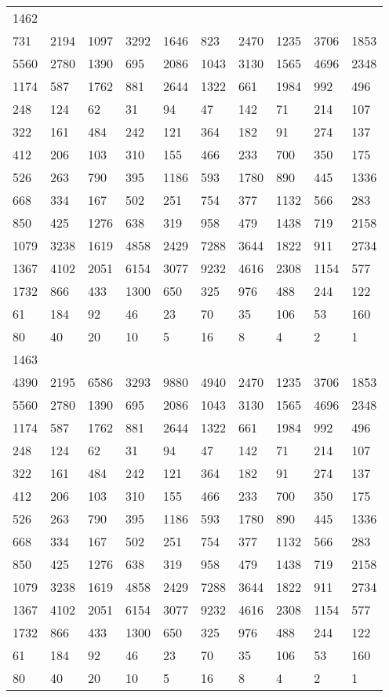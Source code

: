\begin{longtable}{*{10}{l}}
1462&&&&&&&&&\\
731& 2194& 1097& 3292& 1646& 823& 2470& 1235& 3706& 1853\\
5560& 2780& 1390& 695& 2086& 1043& 3130& 1565& 4696& 2348\\
1174& 587& 1762& 881& 2644& 1322& 661& 1984& 992& 496\\
248& 124& 62& 31& 94& 47& 142& 71& 214& 107\\
322& 161& 484& 242& 121& 364& 182& 91& 274& 137\\
412& 206& 103& 310& 155& 466& 233& 700& 350& 175\\
526& 263& 790& 395& 1186& 593& 1780& 890& 445& 1336\\
668& 334& 167& 502& 251& 754& 377& 1132& 566& 283\\
850& 425& 1276& 638& 319& 958& 479& 1438& 719& 2158\\
1079& 3238& 1619& 4858& 2429& 7288& 3644& 1822& 911& 2734\\
1367& 4102& 2051& 6154& 3077& 9232& 4616& 2308& 1154& 577\\
1732& 866& 433& 1300& 650& 325& 976& 488& 244& 122\\
61& 184& 92& 46& 23& 70& 35& 106& 53& 160\\
80& 40& 20& 10& 5& 16& 8& 4& 2& 1\\

1463&&&&&&&&&\\
4390& 2195& 6586& 3293& 9880& 4940& 2470& 1235& 3706& 1853\\
5560& 2780& 1390& 695& 2086& 1043& 3130& 1565& 4696& 2348\\
1174& 587& 1762& 881& 2644& 1322& 661& 1984& 992& 496\\
248& 124& 62& 31& 94& 47& 142& 71& 214& 107\\
322& 161& 484& 242& 121& 364& 182& 91& 274& 137\\
412& 206& 103& 310& 155& 466& 233& 700& 350& 175\\
526& 263& 790& 395& 1186& 593& 1780& 890& 445& 1336\\
668& 334& 167& 502& 251& 754& 377& 1132& 566& 283\\
850& 425& 1276& 638& 319& 958& 479& 1438& 719& 2158\\
1079& 3238& 1619& 4858& 2429& 7288& 3644& 1822& 911& 2734\\
1367& 4102& 2051& 6154& 3077& 9232& 4616& 2308& 1154& 577\\
1732& 866& 433& 1300& 650& 325& 976& 488& 244& 122\\
61& 184& 92& 46& 23& 70& 35& 106& 53& 160\\
80& 40& 20& 10& 5& 16& 8& 4& 2& 1\\


\end{longtable}
